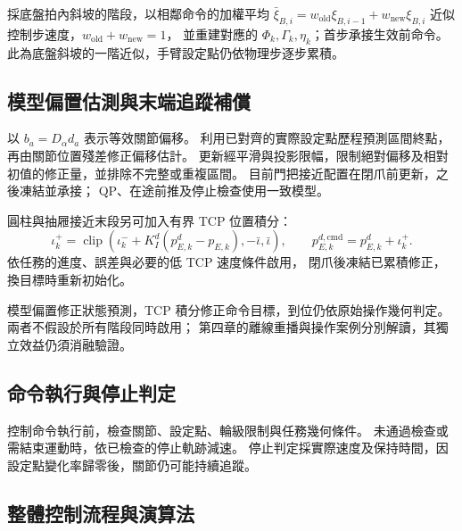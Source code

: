 採底盤拍內斜坡的階段，以相鄰命令的加權平均
$\bar\xi_{B,i}=w_{\mathrm{old}}\xi_{B,i-1}+w_{\mathrm{new}}\xi_{B,i}$
近似控制步速度，$w_{\mathrm{old}}+w_{\mathrm{new}}=1$，
並重建對應的 $\Phi_k,\Gamma_k,\eta_k$；首步承接生效前命令。
此為底盤斜坡的一階近似，手臂設定點仍依物理步逐步累積。

\subsection{模型偏置估測與末端追蹤補償}
\label{subsec:model_bias_tcp_compensation}

以 $b_a=D_\alpha d_a$ 表示等效關節偏移。
利用已對齊的實際設定點歷程預測區間終點，再由關節位置殘差修正偏移估計。
更新經平滑與投影限幅，限制絕對偏移及相對初值的修正量，並排除不完整或重複區間。
目前門把接近配置在閉爪前更新，之後凍結並承接；
QP、在途前推及停止檢查使用一致模型。

圓柱與抽屜接近末段另可加入有界 TCP 位置積分：
\begin{equation}
    \iota_k^+=\operatorname{clip}
    (\iota_k^-+K_I^d(p_{E,k}^d-p_{E,k}),-\bar\iota,\bar\iota),
    \qquad
    p_{E,k}^{d,\mathrm{cmd}}=p_{E,k}^d+\iota_k^+ .
    \label{eq:ch3_bounded_tcp_target_compensation}
\end{equation}
依任務的進度、誤差與必要的低 TCP 速度條件啟用，
閉爪後凍結已累積修正，換目標時重新初始化。

模型偏置修正狀態預測，TCP 積分修正命令目標，到位仍依原始操作幾何判定。
兩者不假設於所有階段同時啟用；
第四章的離線重播與操作案例分別解讀，其獨立效益仍須消融驗證。

\subsection{命令執行與停止判定}
\label{subsec:command_acceptance_stopping}

控制命令執行前，檢查關節、設定點、輪級限制與任務幾何條件。
未通過檢查或需結束運動時，依已檢查的停止軌跡減速。
停止判定採實際速度及保持時間，因設定點變化率歸零後，關節仍可能持續追蹤。

\subsection{整體控制流程與演算法}
\label{subsec:overall_control_algorithm}

